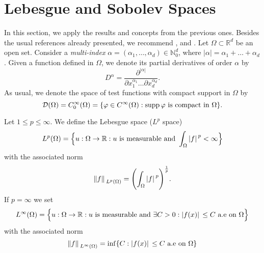 \section{Lebesgue and Sobolev Spaces}
In this section, we apply the results and concepts from the previous ones. Besides the usual references already presented, we recommend \cite{lions2012non}, \cite{huguinho} and \cite{evans2022partial}. Let $\Omega \subset \mathbb{R}^d$ be an open set. Consider a \textit{multi-index} $\alpha = (\alpha_1, \dots, \alpha_d) \in \mathbb{N}_0^d$, where $|\alpha| = \alpha_1 + \dots + \alpha_d$. Given a function defined in $\Omega$, we denote its partial derivatives of order $\alpha$ by
\[
D^\alpha = \frac{\partial^{|\alpha|}}{\partial x_1^{\alpha_1}\dots\partial x_d^{\alpha_d}}.   
\]
As usual, we denote the space of test functions with compact support in $\Omega$ by
\[
\mathcal{D}(\Omega) = C_0^\infty(\Omega) = \{\varphi \in C^\infty(\Omega) : \operatorname{supp}\varphi \text{ is compact in }\Omega\}.
\]

\begin{definition}
    Let \(1 \leq p \leq \infty\). We define the Lebesgue space (\(L^p\) space)
    \[
        L^p(\Omega) = \Big\{u: \Omega \rightarrow \mathbb{R}: u \text{ is measurable and } \int_\Omega \abs*{f}^p < \infty\Big\}
    \]
    with the associated norm
    \[
        \norm*{f}_{L^p(\Omega)} = \Biggl(\int_\Omega \abs*{f}^p\Biggr)^{\frac{1}{p}}.
    \]
    If \(p=\infty\) we set
    \[
        L^\infty(\Omega) = \Big\{u: \Omega \rightarrow \mathbb{R}: u \text{ is measurable and } \exists C > 0: \abs*{f(x)} \leq C \text{ a.e on } \Omega \Big\}
    \]
    with the associated norm
    \[
        \norm*{f}_{L^\infty(\Omega)} = \inf \{C: \abs*{f(x)} \leq C \text{ a.e on } \Omega\}
    \]
\end{definition}

